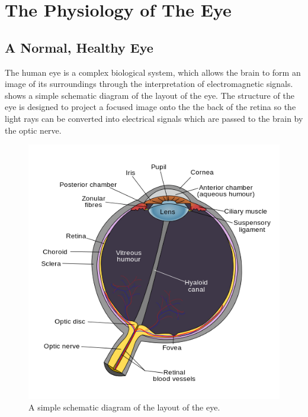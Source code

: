 
\chapter{The Physiology of The Eye}

\label{anatomy}
\section{A Normal, Healthy Eye}

The human eye is a complex biological system, which allows the brain to
form an image of its surroundings through the interpretation of
electromagnetic signals.  shows a simple schematic
diagram of the layout of the eye. The structure of the eye is designed to
project a focused image onto the the back of the retina so the light rays
can be converted into electrical signals which are passed to the brain by
the optic nerve.

\begin{figure}[!htbp]
\centering
  \includegraphics{figures/schematic_diagram_of_the_human_eye}
\caption{A simple schematic diagram of the layout of the eye.\cite{wikiRhcastilhos}}
\label{fig:eye_simple}
\end{figure}

